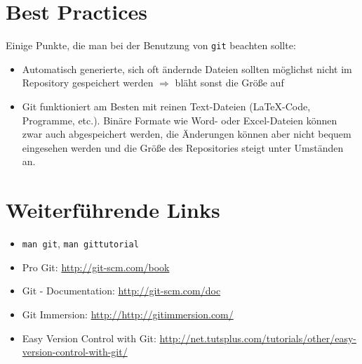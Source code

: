 \section{Best Practices}

Einige Punkte, die man bei der Benutzung von \texttt{git} beachten sollte:
\begin{itemize}
  \item Automatisch generierte, sich oft ändernde Dateien sollten möglichst nicht im Repository gespeichert werden
    $\Rightarrow$ bläht sonst die Größe auf
  \item Git funktioniert am Besten mit reinen Text-Dateien (\LaTeX-Code, Programme, etc.).
    Binäre Formate wie Word- oder Excel-Dateien können zwar auch abgespeichert werden, die Änderungen können aber nicht bequem eingesehen werden und die Größe des Repositories steigt unter Umständen an.
\end{itemize}

\section{Weiterführende Links}
\begin{itemize}
  \item \texttt{man git}, \texttt{man gittutorial}
  \item Pro Git: \url{http://git-scm.com/book}
  \item Git - Documentation: \url{http://git-scm.com/doc}
  \item Git Immersion: \url{http://http://gitimmersion.com/}
  \item Easy Version Control with Git: \url{http://net.tutsplus.com/tutorials/other/easy-version-control-with-git/}
\end{itemize}
